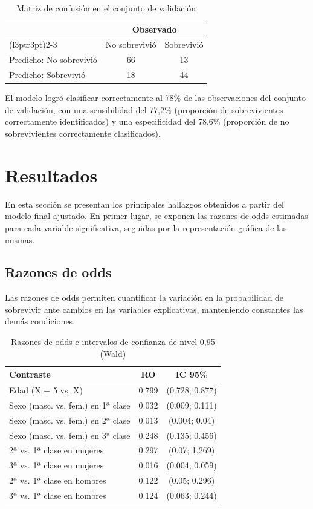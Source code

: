 \documentclass[
  spanish,
  11pt,
  letterpaper,
  DIV=11,
  numbers=noendperiod]{scrartcl}
\begin{document}
\begin{longtable}[t]{lcc}
\caption{\label{tab:unnamed-chunk-16}Matriz de confusión en el conjunto de validación}\\
\toprule
\multicolumn{1}{c}{ } & \multicolumn{2}{c}{Observado} \\
\cmidrule(l{3pt}r{3pt}){2-3}
 & No sobrevivió & Sobrevivió\\
\midrule
Predicho: No sobrevivió & 66 & 13\\
Predicho: Sobrevivió & 18 & 44\\
\bottomrule
\end{longtable}

El modelo logró clasificar correctamente al 78\% de las observaciones
del conjunto de validación, con una sensibilidad del 77,2\% (proporción
de sobrevivientes correctamente identificados) y una especificidad del
78,6\% (proporción de no sobrevivientes correctamente clasificados).

\section{Resultados}\label{resultados}

En esta sección se presentan los principales hallazgos obtenidos a
partir del modelo final ajustado. En primer lugar, se exponen las
razones de odds estimadas para cada variable significativa, seguidas por
la representación gráfica de las mismas.

\subsection{Razones de odds}\label{razones-de-odds}

Las razones de odds permiten cuantificar la variación en la probabilidad
de sobrevivir ante cambios en las variables explicativas, manteniendo
constantes las demás condiciones.

\begin{longtable}[t]{lcc}
\caption{\label{tab:tab-RO}Razones de odds e intervalos de confianza de nivel 0,95 (Wald)}\\
\toprule
Contraste & RO & IC 95\%\\
\midrule
Edad (X + 5 vs. X) & 0.799 & (0.728; 0.877)\\
Sexo (masc. vs. fem.) en 1ª clase & 0.032 & (0.009; 0.111)\\
Sexo (masc. vs. fem.) en 2ª clase & 0.013 & (0.004; 0.04)\\
Sexo (masc. vs. fem.) en 3ª clase & 0.248 & (0.135; 0.456)\\
2ª vs. 1ª clase en mujeres & 0.297 & (0.07; 1.269)\\
\addlinespace
3ª vs. 1ª clase en mujeres & 0.016 & (0.004; 0.059)\\
2ª vs. 1ª clase en hombres & 0.122 & (0.05; 0.296)\\
3ª vs. 1ª clase en hombres & 0.124 & (0.063; 0.244)\\
\bottomrule
\end{longtable}
\end{document}
